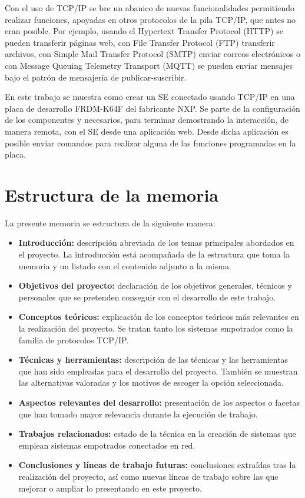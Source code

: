 Con el uso de TCP/IP se bre un abanico de nuevas funcionalidades permitiendo
realizar funciones, apoyadas en otros protocolos de la pila TCP/IP, que antes
no eran posible. Por ejemplo, usando el Hypertext Transfer Protocol (HTTP) se
pueden transferir páginas web, con File Transfer Protocol (FTP) transferir
archivos, con Simple Mail Transfer Protocol (SMTP) enviar correos electrónicos
o con Message Queuing Telemetry Transport (MQTT) se pueden enviar
mensajes bajo el patrón de mensajería de publicar-suscribir.

En este trabajo se muestra como crear un SE conectado usando TCP/IP en una placa
de desarrollo FRDM-K64F del fabricante NXP. Se parte de la configuración de los
componentes  y  necesarios, para
terminar demostrando la interacción, de manera remota, con el SE desde una
aplicación web. Desde dicha aplicación es posible enviar comandos para realizar
alguna de las funciones programadas en la placa.

\section{Estructura de la memoria}\label{sec:estructura}
La presente memoria se estructura de la siguiente manera:

\begin{itemize}
\item
  \textbf{Introducción:} descripción abreviada de los temas principales 
  abordados en el proyecto. La introducción está acompañada de la estructura
  que toma la memoria y un listado con el contenido adjunto a la misma.
\item
  \textbf{Objetivos del proyecto:} declaración de los objetivos generales,
  técnicos y personales que se pretenden conseguir con el desarrollo de este
  trabajo.
\item
  \textbf{Conceptos teóricos:} explicación de los conceptos teóricos más
  relevantes en la realización del proyecto. Se tratan tanto los sistemas
  empotrados como la familia de protocolos TCP/IP.
\item
  \textbf{Técnicas y herramientas:} descripción de las técnicas y las
  herramientas que han sido empleadas para el desarrollo del proyecto. También
  se muestran las alternativas valoradas y los motivos de escoger la opción
  seleccionada.
\item
  \textbf{Aspectos relevantes del desarrollo:} presentación de los aspectos o
  facetas que han tomado mayor relevancia durante la ejecución de trabajo.
\item
  \textbf{Trabajos relacionados:} estado de la técnica en la creación de
  sistemas que emplean sistemas empotrados conectados en red.
\item
  \textbf{Conclusiones y líneas de trabajo futuras:} conclusiones extraídas tras
  la realización del proyecto, así como nuevas líneas de trabajo sobre las que
  mejorar o ampliar lo presentando en este proyecto.
\end{itemize}


